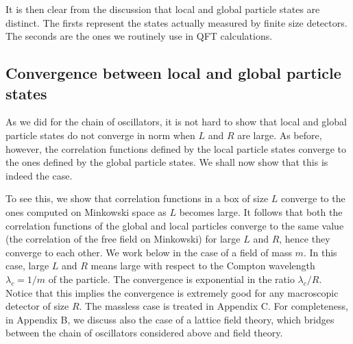 \documentclass[11pt, nofootinbib]{revtex4-2}
\begin{document}
It is then clear from the discussion that local and global particle
states are distinct.  The firsts represent the states actually
measured by finite size detectors.  The seconds are the ones we
routinely use in QFT calculations.

\subsection{Convergence between local and global particle states}

As we did for the chain of oscillators, it is not hard to show that
local and global particle states do not converge in norm when $L$ and
$R$ are large.  As before, however, the correlation functions defined
by the local particle states converge to the ones defined by the
global particle states.  We shall now show that this is indeed the
case.

To see this, we show that correlation functions in a box of size $L$
converge to the ones computed on Minkowski space as $L$ becomes large. 
It follows that both the correlation functions of the global and local
particles converge to the same value (the correlation of the free
field on Minkowski) for large $L$ and $R$, hence they converge to each
other.  We work below in the case of a field of mass $m$.  In this
case, large $L$ and $R$ means large with respect to the Compton
wavelength $\lambda_{c}=1/m$ of the particle.  The convergence is
exponential in the ratio $\lambda_{c}/R$.  Notice that this implies
the convergence is extremely good for any macroscopic detector of size
$R$.  The massless case is treated in Appendix C. For completeness, in
Appendix B, we discuss also the case of a lattice field theory, which
bridges between the chain of oscillators considered above and field
theory.
\end{document}
